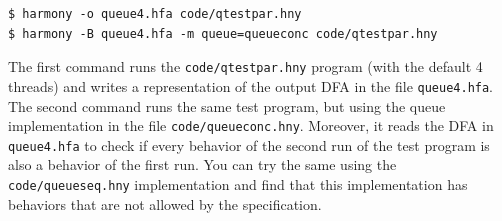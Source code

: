 \documentclass{report}
\newenvironment{code}{
\tcolorbox
}{
\endtcolorbox
}
\begin{document}
\begin{code}
\begin{verbatim}
$ harmony -o queue4.hfa code/qtestpar.hny
$ harmony -B queue4.hfa -m queue=queueconc code/qtestpar.hny
\end{verbatim}
\end{code}

The first command runs the \texttt{code/qtestpar.hny} program (with the
default 4 threads)
and writes a representation of the output DFA in the file \texttt{queue4.hfa}.
The second command runs the same test program, but using the queue
implementation in the file \texttt{code/queueconc.hny}.  Moreover, it reads
the DFA in \texttt{queue4.hfa} to check if every behavior of the second
run of the test program is also a behavior of the first run.
You can try the same using the \texttt{code/queueseq.hny} implementation
and find that this implementation has behaviors that are not allowed by
the specification.
\end{document}
